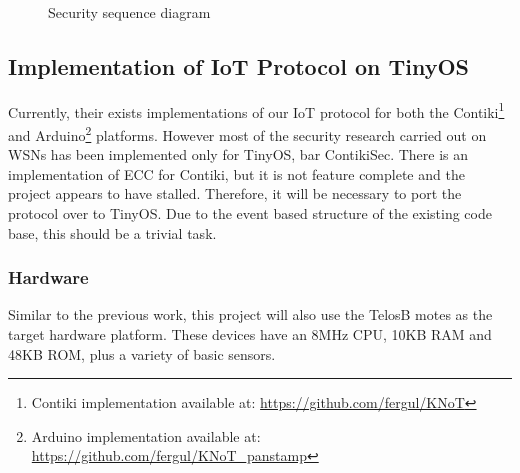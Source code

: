 \documentclass{mprop}
\begin{document}
\begin{figure}[h!]
\begin{center}

\caption{Security sequence diagram}
\label{fig:sequence_diagram}
\end{center}
\end{figure}



\subsection{Implementation of IoT Protocol on TinyOS} %
\label{sub:implementation_of_iot_protocol_on_tinyos}
Currently, their exists implementations of our IoT protocol for both the Contiki\footnote{Contiki implementation available at: \url{https://github.com/fergul/KNoT}} and Arduino\footnote{Arduino implementation available at: \url{https://github.com/fergul/KNoT_panstamp}} platforms. However most of the security research carried out on WSNs has been implemented only for TinyOS, bar ContikiSec. There is an implementation of ECC for Contiki, but it is not feature complete and the project appears to have stalled\cite{ContikiECC}. Therefore, it will be necessary to port the protocol over to TinyOS. Due to the event based structure of the existing code base, this should be a trivial task.

\subsubsection{Hardware} %
\label{ssub:hardware}
Similar to the previous work\cite{KNoT}, this project will also use the TelosB motes as the target hardware platform. These devices have an 8MHz CPU, 10KB RAM and 48KB ROM, plus a variety of basic sensors.
\end{document}

